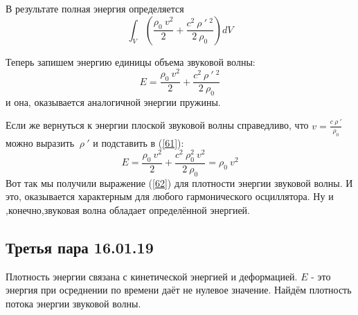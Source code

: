 \documentclass[14pt,a4paper,oneside]{extarticle}	%
\newcommand{\bracket}[1] {\left( #1 \right) } %
\begin{document}
В результате полная энергия определяется 
\begin{equation}\label{60}
\int_{V}\bracket{\frac{\rho_{0} \: v^{2}}{2} + \frac{c^{2}\:\rho\:'\:^{2}}{2\:\rho_{0}}}dV
\end{equation}

Теперь запишем энергию единицы объема звуковой волны:
\begin{equation}\label{61}
E = \frac{\rho_{0} \: v^{2}}{2} + \frac{c^{2}\:\rho\:'\:^{2}}{2\:\rho_{0}}
\end{equation}
и она, оказывается аналогичной энергии пружины.

Если же вернуться к энергии плоской звуковой волны справедливо, что $ v = \frac{c\:\rho\:'}{\rho_{0}} $ можно выразить $ \:\rho\:' $ и подставить в (\ref{61}):
\begin{equation}\label{62}
E = \frac{\rho_{0} \: v^{2}}{2} + \frac{c^{2}\:\rho_{0}^{2}\:v^{2}}{2\:\rho_{0}} = \rho_{0}\:v^{2}
\end{equation}
Вот так мы получили выражение (\ref{62}) для плотности энергии звуковой волны.
И это, оказывается характерным для любого гармонического осциллятора. Ну и ,конечно,звуковая волна обладает определённой энергией.
\newpage
\begin{center}
	\section*{Третья пара 16.01.19} %
\end{center}
Плотность энергии связана с кинетической энергией и деформацией.
$ E $ - это энергия при осреднении по времени даёт не нулевое значение.
Найдём плотность потока энергии звуковой волны. 
\end{document}
